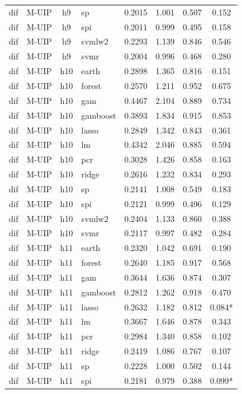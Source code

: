 \begin{ThreePartTable}
\begin{longtable}[t]{llclcccc}
dif & M-UIP & h9 & sp & 0.2015 & 1.001 & 0.507 & 0.152\\
dif & M-UIP & h9 & spi & 0.2011 & 0.999 & 0.495 & 0.158\\
dif & M-UIP & h9 & svmlw2 & 0.2293 & 1.139 & 0.846 & 0.546\\
dif & M-UIP & h9 & svmr & 0.2004 & 0.996 & 0.468 & 0.280\\
\addlinespace
dif & M-UIP & h10 & earth & 0.2898 & 1.365 & 0.816 & 0.151\\
dif & M-UIP & h10 & forest & 0.2570 & 1.211 & 0.952 & 0.675\\
dif & M-UIP & h10 & gam & 0.4467 & 2.104 & 0.889 & 0.734\\
dif & M-UIP & h10 & gamboost & 0.3893 & 1.834 & 0.915 & 0.853\\
dif & M-UIP & h10 & lasso & 0.2849 & 1.342 & 0.843 & 0.361\\
dif & M-UIP & h10 & lm & 0.4342 & 2.046 & 0.885 & 0.594\\
dif & M-UIP & h10 & pcr & 0.3028 & 1.426 & 0.858 & 0.163\\
dif & M-UIP & h10 & ridge & 0.2616 & 1.232 & 0.834 & 0.293\\
dif & M-UIP & h10 & sp & 0.2141 & 1.008 & 0.549 & 0.183\\
dif & M-UIP & h10 & spi & 0.2121 & 0.999 & 0.496 & 0.129\\
dif & M-UIP & h10 & svmlw2 & 0.2404 & 1.133 & 0.860 & 0.388\\
dif & M-UIP & h10 & svmr & 0.2117 & 0.997 & 0.482 & 0.284\\
\addlinespace
dif & M-UIP & h11 & earth & 0.2320 & 1.042 & 0.691 & 0.190\\
dif & M-UIP & h11 & forest & 0.2640 & 1.185 & 0.917 & 0.568\\
dif & M-UIP & h11 & gam & 0.3644 & 1.636 & 0.874 & 0.307\\
dif & M-UIP & h11 & gamboost & 0.2812 & 1.262 & 0.918 & 0.470\\
dif & M-UIP & h11 & lasso & 0.2632 & 1.182 & 0.812 & 0.084*\\
dif & M-UIP & h11 & lm & 0.3667 & 1.646 & 0.878 & 0.343\\
dif & M-UIP & h11 & pcr & 0.2984 & 1.340 & 0.858 & 0.102\\
dif & M-UIP & h11 & ridge & 0.2419 & 1.086 & 0.767 & 0.107\\
dif & M-UIP & h11 & sp & 0.2228 & 1.000 & 0.502 & 0.144\\
dif & M-UIP & h11 & spi & 0.2181 & 0.979 & 0.388 & 0.099*\\

\end{longtable}
\end{ThreePartTable}
